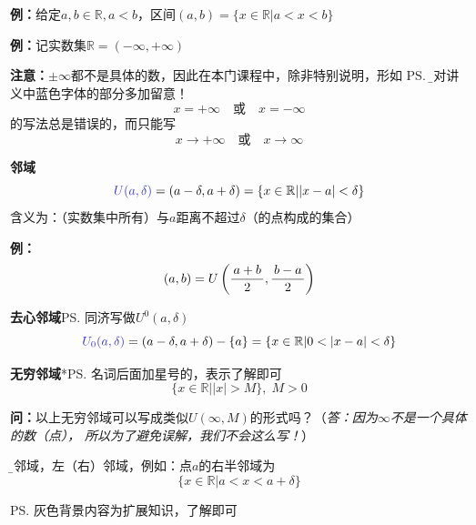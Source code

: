 {\bf 例：}给定$a,b\in\mathbb{R},a<b$，区间$(a,b)=\{x\in\mathbb{R}|a<x<b\}$

{\bf 例：}记实数集$\mathbb{R}=(-\infty,+\infty)$

{\bf 注意：}{$\pm\infty$都不是具体的数，因此在本门课程中，除非特别说明，形如
\ps{\b 请对讲义中蓝色字体的部分多加留意！}
$$x=+\infty\quad\mbox{或}\quad x=-\infty$$
的写法总是错误的，而只能写
$$x\to+\infty\quad\mbox{或}\quad x\to\infty$$
}

{\bf 邻域}
$${\b U(a,\delta)}=(a-\delta,a+\delta)=\{x\in\mathbb{R}||x-a|<\delta\}$$
含义为：（实数集中所有）与$a$距离不超过$\delta$（的点构成的集合）

{\bf 例：}
$$(a,b)=U\left(\displaystyle\frac{\,{a+b}\,}{\,{2}\,},\displaystyle\frac{\,{b-a}\,}{\,{2}\,}\right)$$

{\bf 去心邻域}\ps{同济写做$U^0(a,\delta)$}
$${\b
U_0(a,\delta)}=(a-\delta,a+\delta)-\{a\}=\{x\in\mathbb{R}|0<|x-a|<\delta\}$$

{\bf 无穷邻域}*\ps{名词后面加星号的，表示了解即可}
$$\{x\in\mathbb{R}||x|>M\},\;M>0$$

{\bf 问：}以上无穷邻域可以写成类似$U(\infty,M)$的形式吗？（{\it 答：因为$\infty$不是一个具体的数（点），
所以为了避免误解，我们不会这么写！}）

{\b 半邻域，左（右）邻域}，例如：点$a$的右半邻域为
$$\{x\in\mathbb{R}|a<x<a+\delta\}$$

\ps{灰色背景内容为扩展知识，了解即可}


